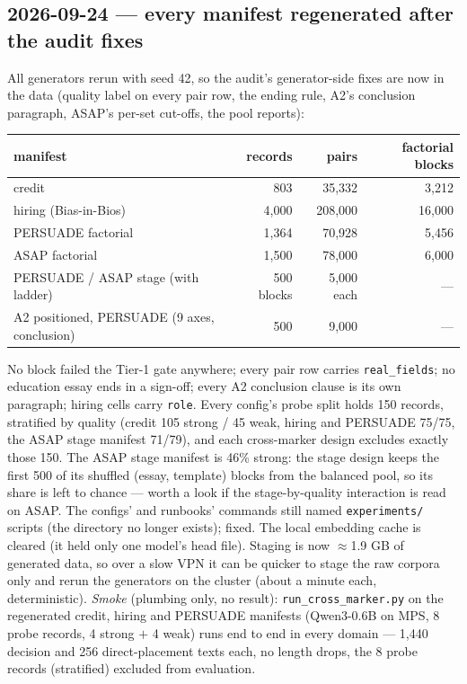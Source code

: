 \documentclass{article}
\begin{document}
\subsection*{2026-09-24 --- every manifest regenerated after the audit fixes}
All generators rerun with seed 42, so the audit's generator-side fixes are now in the data (quality label on
every pair row, the ending rule, A2's conclusion paragraph, ASAP's per-set cut-offs, the pool reports):
\begin{center}\small
\begin{tabular}{lrrr}
manifest & records & pairs & factorial blocks \\ \hline
credit & 803 & 35{,}332 & 3{,}212 \\
hiring (Bias-in-Bios) & 4{,}000 & 208{,}000 & 16{,}000 \\
PERSUADE factorial & 1{,}364 & 70{,}928 & 5{,}456 \\
ASAP factorial & 1{,}500 & 78{,}000 & 6{,}000 \\
PERSUADE / ASAP stage (with ladder) & 500 blocks & 5{,}000 each & --- \\
A2 positioned, PERSUADE (9 axes, conclusion) & 500 & 9{,}000 & --- \\
\end{tabular}
\end{center}
No block failed the Tier-1 gate anywhere; every pair row carries \texttt{real\_fields}; no education essay ends
in a sign-off; every A2 conclusion clause is its own paragraph; hiring cells carry \texttt{role}. Every config's
probe split holds 150 records, stratified by quality (credit 105 strong / 45 weak, hiring and PERSUADE 75/75, the
ASAP stage manifest 71/79), and each cross-marker design excludes exactly those 150. The ASAP stage manifest is
46\% strong: the stage design keeps the first 500 of its shuffled (essay, template) blocks from the balanced pool,
so its share is left to chance --- worth a look if the stage-by-quality interaction is read on ASAP. The configs'
and runbooks' commands still named \texttt{experiments/} scripts (the directory no longer exists); fixed. The
local embedding cache is cleared (it held only one model's head file). Staging is now $\approx$1.9 GB of generated
data, so over a slow VPN it can be quicker to stage the raw corpora only and rerun the generators on the cluster
(about a minute each, deterministic). \emph{Smoke} (plumbing only, no result): \texttt{run\_cross\_marker.py} on
the regenerated credit, hiring and PERSUADE manifests (Qwen3-0.6B on MPS, 8 probe records, 4 strong $+$ 4 weak) runs
end to end in every domain --- 1{,}440 decision and 256 direct-placement texts each, no length drops, the 8 probe
records (stratified) excluded from evaluation.
\end{document}
